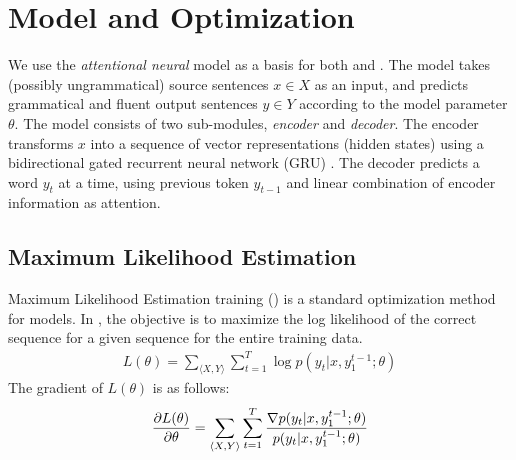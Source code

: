 \section{Model and Optimization}
\vspace{-2mm}
\label{sec:model}
\setlength{\textfloatsep}{\textfloatsepsave}
We use the {\em attentional neural \encdec} model \cite{2014arXiv1409.0473B} as a basis for both \proposed and \mle.
The model takes (possibly ungrammatical) source sentences $x \in X$ as an input, and predicts grammatical and fluent output sentences $y \in Y$ according to the model parameter $\theta$.
The model consists of two sub-modules, {\em encoder} and {\em decoder}. 
The encoder transforms $x$ into a sequence of vector representations (hidden states) using a bidirectional gated recurrent neural network (GRU) \cite{2014arXiv1412.3555C}.
The decoder predicts a word $y_t$ at a time, using previous token $y_{t-1}$ and linear combination of encoder information as attention.
%

\vspace{-1mm}
\subsection{Maximum Likelihood Estimation}
\vspace{-1mm}
\label{sec:mle}
Maximum Likelihood Estimation training (\mle) is a standard optimization method for \encdec models.
In \mle, the objective is to maximize the log likelihood of the correct sequence for a given sequence for the entire training data.
\begin{eqnarray}
L(\theta) = \sum_{\langle X,Y \rangle} \sum_{t=1}^{T}\log p(y_{t}|x, y_1^{t-1};\theta)
\end{eqnarray}
The gradient of $L(\theta)$ is as follows:
\begin{eqnarray}
\frac {\partial L(\theta)}{\partial \theta} = \sum_{\langle X,Y \rangle} \sum_{t=1}^{T} \frac{\nabla p(y_t|x, y_1^{t-1};\theta)}{p(y_t|x,y_1^{t-1};\theta)}
\end{eqnarray}

